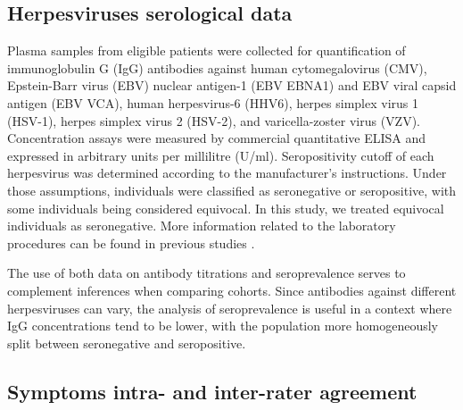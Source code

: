 
\subsection{Herpesviruses serological data}

Plasma samples from eligible patients were collected for quantification of immunoglobulin G (IgG) antibodies against human cytomegalovirus (CMV), Epstein-Barr virus (EBV) nuclear antigen-1 (EBV EBNA1) and EBV viral capsid antigen (EBV VCA), human herpesvirus-6 (HHV6), herpes simplex virus 1 (HSV-1), herpes simplex virus 2 (HSV-2), and varicella-zoster virus (VZV).
Concentration assays were measured by commercial quantitative ELISA and expressed in arbitrary units per millilitre (U/ml).
Seropositivity cutoff of each herpesvirus was determined according to the manufacturer's instructions.
Under those assumptions, individuals were classified as seronegative or seropositive, with some individuals being considered equivocal.
In this study, we treated equivocal individuals as seronegative.
More information related to the laboratory procedures can be found in previous studies \citep{cliff2019CellularImmune, domingues2021HerpesvirusesSerologya}.

The use of both data on antibody titrations and seroprevalence serves to complement inferences when comparing cohorts.
Since antibodies against different herpesviruses can vary, the analysis of seroprevalence is useful in a context where IgG concentrations tend to be lower, with the population more homogeneously split between seronegative and seropositive.


\subsection{Symptoms intra- and inter-rater agreement}

